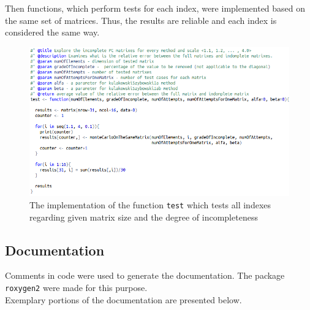 Then functions, which perform tests for each index, were implemented based on the same set of matrices. Thus, the results are reliable and each index is considered the same way.

\begin{figure}[h]
\centerline{\includegraphics[scale=0.58]{images/kod22.png}}
\caption{The implementation of the function \texttt{test} which tests all indexes regarding given matrix size and the degree of incompleteness}
\label{fig:rstudio}
\end{figure}


\subsection{Documentation}
Comments in code were used to generate the documentation. The package \texttt{roxygen2} were made for this purpose. \\ Exemplary portions of the documentation are presented below.

